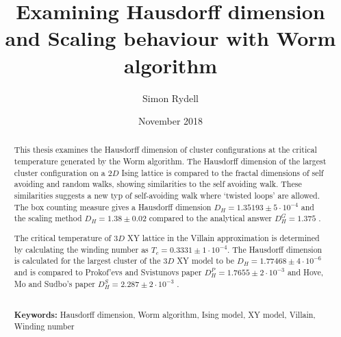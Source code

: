 \documentclass[nocoverpage,swedish,g5paper]{thesis}
\title{Examining Hausdorff dimension and Scaling behaviour with Worm algorithm}
\author{Simon Rydell}
\date{November 2018}
\begin{document}

\begin{abstract}

This thesis examines the Hausdorff dimension of cluster configurations at the critical temperature generated by the Worm algorithm. The Hausdorff dimension of the largest cluster configuration on a $2D$ Ising lattice is compared to the fractal dimensions of self avoiding and random walks, showing similarities to the self avoiding walk. These similarities suggests a new typ of self-avoiding walk where `twisted loops' are allowed. The box counting measure \cite{strogatz:dynamics_chaos} gives a Hausdorff dimension $D_H = 1.35193 \pm 5 \cdot 10^{-4}$ and the scaling method \cite{Hove:hausdorff_crit_fluctuations} $D_H = 1.38 \pm 0.02$ compared to the analytical answer $D_H^{G} = 1.375$ \cite{Duplantier:GeoHausdorff}.

The critical temperature of $3D$ XY lattice in the Villain approximation is determined by calculating the winding number as $T_c = 0.3331 \pm 1 \cdot 10^{-4}$. The Hausdorff dimension is calculated for the largest cluster of the $3D$ XY model to be $D_H = 1.77468 \pm 4 \cdot 10^{-6}$ and is compared to Prokof'evs and Svistunovs paper $D_H^P = 1.7655 \pm 2 \cdot 10^{-3}$ \cite{Prokofev:comment_on_hove_hausdorff_crit_fluct} and Hove, Mo and Sudbo's paper $D_H^S = 2.287 \pm 2 \cdot 10^{-3}$ \cite{Hove:hausdorff_crit_fluctuations}.
\\ \noindent \strut \\
\textbf{Keywords:} Hausdorff dimension, Worm algorithm, Ising model, XY model, Villain, Winding number

\newpage




\end{abstract}
\end{document}
